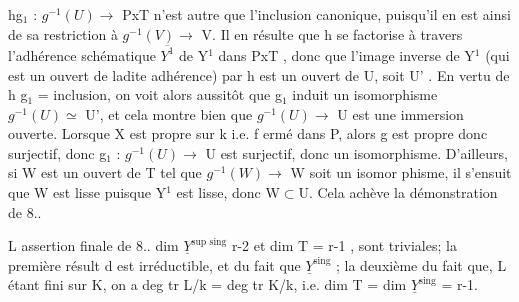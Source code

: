 
hg$_1$ :  $g^{-1}(U) \longrightarrow$ PxT  n'est autre que l'inclusion canonique, puisqu'il
en est ainsi de sa restriction à $g^{-1}(V) \rightarrow$ V.  
 Il en résulte que h  se factorise
à travers l'adhérence schématique  $\overline{Y^1}$ de Y$^1$ dans  PxT , donc que
l'image inverse de Y$^1$ (qui est un ouvert de ladite adhérence) par h
est un ouvert de U, soit U' . En vertu de  h g$_1$ = inclusion, on
voit alors aussitôt que  g$_1$ induit un isomorphisme  $g^{-1}(U) \simeq$ U', et
 cela montre bien que  $g^{-1}(U) \longrightarrow$ U est une immersion ouverte.
Lorsque X est propre sur k i.e. f ermé dans P, alors  g est propre donc
surjectif, donc  g$_1$ : $g^{-1}(U) \longrightarrow$ U est surjectif, donc un isomorphisme.
D'ailleurs, si  W est un ouvert de T tel que  $g^{-1}(W) \longrightarrow$ W soit un isomor%
phisme, il s'ensuit que W est lisse puisque Y$^1$ est lisse, donc W$\subset$U.
Cela achève la démonstration de 8.. 

  L assertion finale de 8..\hand{,} dim $\underline{Y}^{\text{sup sing}}$ \over{=}{\unsure{$\leq$}} r-2\hand{,} et
dim T = r-1 , sont triviales;  la première résult d 
   est irréductible, et du fait que
  $\underline{Y}^{\text{sing}}$  ; la deuxième du fait que, L étant fini sur K, on a
deg tr L/k = deg tr K/k, i.e.   dim T = dim $\underline{Y}^{\text{sing}}$ = r-1.


